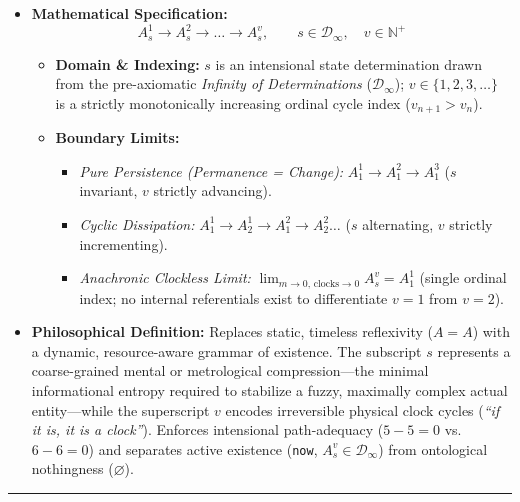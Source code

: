 \documentclass[
]{article}
\providecommand{\tightlist}{%
  \setlength{\itemsep}{0pt}\setlength{\parskip}{0pt}}
\begin{document}
\begin{itemize}
\tightlist
\item
  \textbf{Mathematical Specification:}
  \[A_s^1 \longrightarrow A_s^2 \longrightarrow \dots \longrightarrow A_s^v, \qquad s \in \mathcal{D}_\infty, \quad v \in \mathbb{N}^+\]

  \begin{itemize}
  \tightlist
  \item
    \textbf{Domain \& Indexing:} \(s\) is an intensional state
    determination drawn from the pre-axiomatic \emph{Infinity of
    Determinations} (\(\mathcal{D}_\infty\));
    \(v \in \{1, 2, 3, \dots\}\) is a strictly monotonically increasing
    ordinal cycle index (\(v_{n+1} > v_n\)).
  \item
    \textbf{Boundary Limits:}

    \begin{itemize}
    \tightlist
    \item
      \emph{Pure Persistence (Permanence = Change):}
      \(A_1^1 \to A_1^2 \to A_1^3\) (\(s\) invariant, \(v\) strictly
      advancing).
    \item
      \emph{Cyclic Dissipation:}
      \(A_1^1 \to A_2^1 \to A_1^2 \to A_2^2 \dots\) (\(s\) alternating,
      \(v\) strictly incrementing).
    \item
      \emph{Anachronic Clockless Limit:}
      \(\lim_{m \to 0,\,\text{clocks} \to 0} A_s^v = A_1^1\) (single
      ordinal index; no internal referentials exist to differentiate
      \(v = 1\) from \(v = 2\)).
    \end{itemize}
  \end{itemize}
\item
  \textbf{Philosophical Definition:} Replaces static, timeless
  reflexivity (\(A = A\)) with a dynamic, resource-aware grammar of
  existence. The subscript \(s\) represents a coarse-grained mental or
  metrological compression---the minimal informational entropy required
  to stabilize a fuzzy, maximally complex actual entity---while the
  superscript \(v\) encodes irreversible physical clock cycles
  (\emph{``if it is, it is a clock''}). Enforces intensional
  path-adequacy (\(5 - 5 = 0\) vs.~\(6 - 6 = 0\)) and separates active
  existence (\texttt{now}, \(A_s^v \in \mathcal{D}_\infty\)) from
  ontological nothingness (\(\varnothing\)).
\end{itemize}

\begin{center}\rule{0.5\linewidth}{0.5pt}\end{center}
\end{document}
